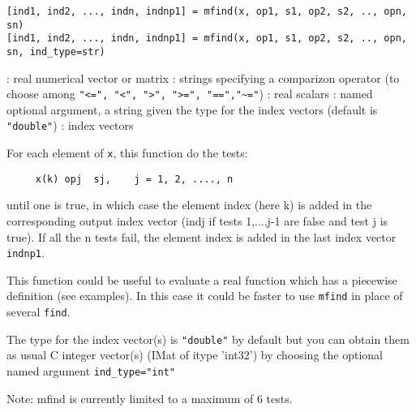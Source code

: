 
\begin{mandesc}
\end{mandesc}

\begin{calling_sequence}
\begin{verbatim}
[ind1, ind2, ..., indn, indnp1] = mfind(x, op1, s1, op2, s2, .., opn, sn)
[ind1, ind2, ..., indn, indnp1] = mfind(x, op1, s1, op2, s2, .., opn, sn, ind_type=str)
\end{verbatim}
\end{calling_sequence}
\begin{parameters}
  \begin{varlist}
    :  real numerical vector or matrix
    : strings specifying a comparizon operator (to choose among \verb+"<=", "<", ">", ">=", "==","~="+)
    :  real scalars
    :  named optional argument, a string given the type for the index vectors (default is \verb+"double"+)
    : index vectors
  \end{varlist}
\end{parameters}

\begin{mandescription}
For each element of \verb+x+, this function do the tests:
\begin{verbatim}
     x(k) opj  sj,    j = 1, 2, ...., n
\end{verbatim}
until one is true, in which case the element index (here k) is added in the
corresponding output index vector (indj if tests 1,...,j-1 are false and test j is true).
If all the n tests fail, the element index is added in the last index vector \verb+indnp1+.

This function could be useful to evaluate a real function which has a piecewise definition
(see examples). In this case it could be faster to use \verb+mfind+ in place of several \verb+find+.


The type for the index vector(s) is \verb+"double"+ by default but you
can obtain them as usual C integer vector(s) (IMat of itype 'int32') 
by choosing the optional named argument \verb+ind_type="int"+

Note: mfind is currently limited to a maximum of 6 tests.
\end{mandescription}

